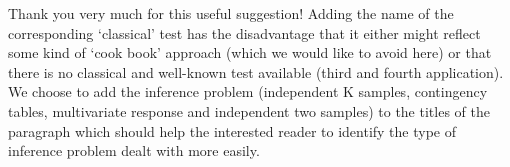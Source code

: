 \documentclass[11pt]{article}
\begin{document}
\begin{enumerate}
Thank you very much for this useful suggestion! Adding the name of the
corresponding `classical' test has the disadvantage that it either might
reflect some kind of `cook book' approach (which we would like to avoid
here) or that there is no classical and well-known test available (third and
fourth application). We choose to add the inference problem (independent K
samples, contingency tables, multivariate response and independent two
samples) to the titles of the paragraph which should help the interested
reader to identify the type of inference problem dealt with more easily.
 

\end{enumerate}
\end{document}
